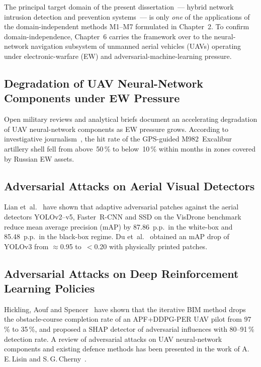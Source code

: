 The principal target domain of the present dissertation~--- hybrid
network intrusion detection and prevention systems~--- is only
\emph{one} of the applications of the domain-independent methods
\textsf{M1}--\textsf{M7} formulated in Chapter~2. To confirm
domain-independence, Chapter~6 carries the framework over to the
neural-network navigation subsystem of unmanned aerial vehicles
(UAVs) operating under electronic-warfare (EW) and
adversarial-machine-learning pressure.

\subsection{Degradation of UAV Neural-Network Components under EW
Pressure}

Open military reviews and analytical briefs document an accelerating
degradation of UAV neural-network components as EW pressure grows. According to investigative journalism~\cite{wapo_excalibur_2024},
the hit rate of the GPS-guided M982~Excalibur artillery shell fell
from above~50\,\% to below~10\,\% within months in zones covered by
Russian EW assets.

\subsection{Adversarial Attacks on Aerial Visual Detectors}

Lian et~al.~\cite{lian_2022_uav} have shown that adaptive
adversarial patches against the aerial detectors YOLOv2--v5,
Faster~R-CNN and SSD on the VisDrone benchmark reduce mean average
precision (mAP) by 87.86~p.p.\ in the white-box and 85.48~p.p.\ in
the black-box regime. Du et~al.~\cite{du_2022_uav} obtained an
mAP drop of YOLOv3 from $\approx$0.95 to~$<$0.20 with physically
printed patches.

\subsection{Adversarial Attacks on Deep Reinforcement Learning
Policies}

Hickling, Aouf and Spencer~\cite{hickling_2023_uav} have shown that
the iterative BIM method drops the obstacle-course completion rate
of an APF+DDPG-PER UAV pilot from 97\,\% to 35\,\%, and proposed a
SHAP detector of adversarial influences with 80--91\,\% detection
rate. A review of adversarial attacks on UAV neural-network
components and existing defence methods has been presented in the
work of A.\,E.\,Lisin and S.\,G.\,Cherny~\cite{Lisin2023uav}.

